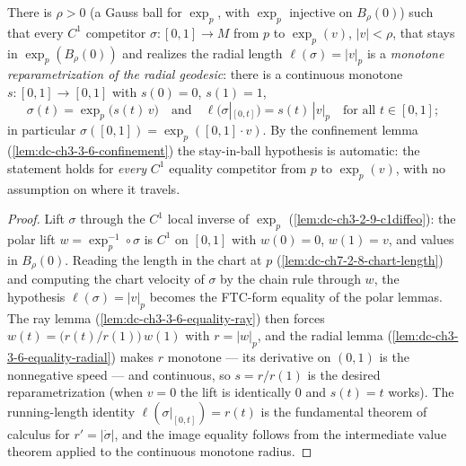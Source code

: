 \begin{lemma}
  \label{lem:dc-ch3-3-6-equality-manifold}


  There is $\rho>0$ (a Gauss ball for $\exp_p$, with $\exp_p$ injective on
  $B_\rho(0)$) such that every $C^1$ competitor $\sigma:[0,1]\to M$ from $p$
  to $\exp_p(v)$, $|v|<\rho$, that stays in $\exp_p(B_\rho(0))$ and realizes
  the radial length $\ell(\sigma)=|v|_p$ is a \emph{monotone reparametrization
  of the radial geodesic}: there is a continuous monotone
  $s:[0,1]\to[0,1]$ with $s(0)=0$, $s(1)=1$,
  $$\sigma(t)=\exp_p\big(s(t)\,v\big)\quad\text{and}\quad
    \ell\big(\sigma|_{[0,t]}\big)=s(t)\,|v|_p\quad\text{for all }t\in[0,1];$$
  in particular $\sigma([0,1])=\exp_p([0,1]\cdot v)$. By the confinement lemma
  (\cref{lem:dc-ch3-3-6-confinement}) the stay-in-ball hypothesis is
  automatic: the statement holds for \emph{every} $C^1$ equality competitor
  from $p$ to $\exp_p(v)$, with no assumption on where it travels.
\end{lemma}
\begin{proof}
  \sketch

  Lift $\sigma$ through the $C^1$ local inverse of $\exp_p$
  (\cref{lem:dc-ch3-2-9-c1diffeo}): the polar lift
  $w=\exp_p^{-1}\circ\sigma$ is $C^1$ on $[0,1]$ with $w(0)=0$, $w(1)=v$, and
  values in $B_\rho(0)$. Reading the length in the chart at $p$
  (\cref{lem:dc-ch7-2-8-chart-length}) and computing the chart velocity of
  $\sigma$ by the chain rule through $w$, the hypothesis
  $\ell(\sigma)=|v|_p$ becomes the FTC-form equality of the polar lemmas.
  The ray lemma (\cref{lem:dc-ch3-3-6-equality-ray}) then forces
  $w(t)=\big(r(t)/r(1)\big)\,w(1)$ with $r=|w|_p$, and the radial lemma
  (\cref{lem:dc-ch3-3-6-equality-radial}) makes $r$ monotone — its derivative
  on $(0,1)$ is the nonnegative speed — and continuous, so
  $s=r/r(1)$ is the desired reparametrization (when $v=0$ the lift is
  identically $0$ and $s(t)=t$ works). The running-length identity
  $\ell(\sigma|_{[0,t]})=r(t)$ is the fundamental theorem of calculus for
  $r'=|\dot\sigma|$, and the image equality follows from the intermediate
  value theorem applied to the continuous monotone radius.
\end{proof}

